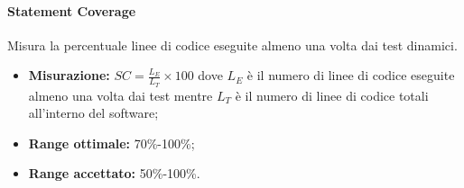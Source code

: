 			\paragraph{Statement Coverage} \Spazio
			Misura la percentuale linee di codice eseguite almeno una volta dai test dinamici.
				\begin{itemize}
					\item \textbf{Misurazione:} $SC=\frac{L_E}{L_T}\times 100$ dove $L_E$ è il numero di linee di codice eseguite almeno una volta dai test mentre $L_T$ è il numero di linee di codice totali all'interno del software;
					\item \textbf{Range ottimale:} 70\%-100\%;
					\item \textbf{Range accettato:} 50\%-100\%.
		    	\end{itemize}
